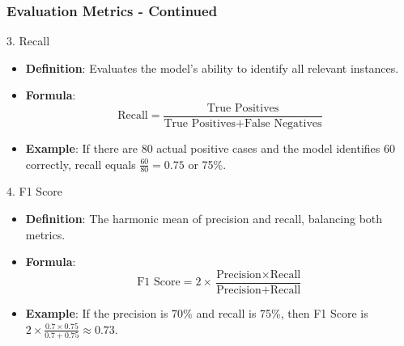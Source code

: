 \documentclass[aspectratio=169]{beamer}
\begin{document}
\begin{frame}[fragile]
    \frametitle{Evaluation Metrics - Continued}
    \begin{block}{3. Recall}
        \begin{itemize}
            \item \textbf{Definition}: Evaluates the model’s ability to identify all relevant instances.
            \item \textbf{Formula}:
            \[
            \text{Recall} = \frac{\text{True Positives}}{\text{True Positives} + \text{False Negatives}}
            \]
            \item \textbf{Example}: If there are 80 actual positive cases and the model identifies 60 correctly, recall equals \( \frac{60}{80} = 0.75 \) or 75\%.
        \end{itemize}
    \end{block}
    
    \begin{block}{4. F1 Score}
        \begin{itemize}
            \item \textbf{Definition}: The harmonic mean of precision and recall, balancing both metrics.
            \item \textbf{Formula}:
            \[
            \text{F1 Score} = 2 \times \frac{\text{Precision} \times \text{Recall}}{\text{Precision} + \text{Recall}}
            \]
            \item \textbf{Example}: If the precision is 70\% and recall is 75\%, then F1 Score is \( 2 \times \frac{0.7 \times 0.75}{0.7 + 0.75} \approx 0.73 \).
        \end{itemize}
    \end{block}
\end{frame}
\end{document}
